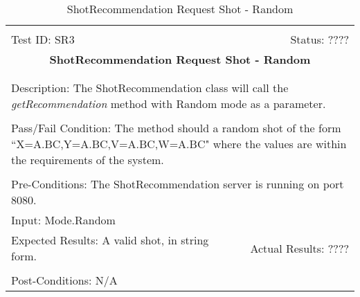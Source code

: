 \documentclass[11pt]{article}
\begin{document}
\begin{center}
\begin{table}[H]
\begin{tabular}{|l r|}\hline&\\[-2mm]
	Test ID: SR3	&Status: ????\\[-3mm]
	\multicolumn{2}{|c|}{\textbf{\large{ShotRecommendation Request Shot - Random}}}\\&\\\hline&\\[-3mm]
	\multicolumn{2}{|p{\textwidth}|}{Description: The ShotRecommendation class will call the \textit{getRecommendation} method with Random mode as a parameter.}\\[1mm]\hline&\\[-3mm]
	\multicolumn{2}{|p{\textwidth}|}{Pass/Fail Condition: The method should a random shot of the form ``X=A.BC,Y=A.BC,V=A.BC,W=A.BC" where the values are within the requirements of the system.}\\[1mm]\hline&\\[-3mm]
	\multicolumn{2}{|p{\textwidth}|}{Pre-Conditions: The ShotRecommendation server is running on port 8080.}\\[4mm]
	\multicolumn{2}{|p{\textwidth}|}{Input: Mode.Random}\\[2mm]\hline
	\multicolumn{1}{|p{0.49\textwidth}}{Expected Results: A valid shot, in string form.}	&\multicolumn{1}{|p{0.45\textwidth}|}{Actual Results: ????}\\\hline&\\[-3mm]
	\multicolumn{2}{|p{\textwidth}|}{Post-Conditions: N/A}\\\hline
\end{tabular}
\caption{ShotRecommendation Request Shot - Random}
\end{table}
\end{center}
\end{document}
